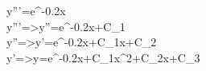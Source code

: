 y'''=e^{-0.2x}\\
\int y'''=>y''=e^{-0.2x}+C_1\\
\int y''=>y'=e^{-0.2x}+C_1x+C_2\\
\int y'=>y=e^{-0.2x}+C_1x^2+C_2x+C_3\\